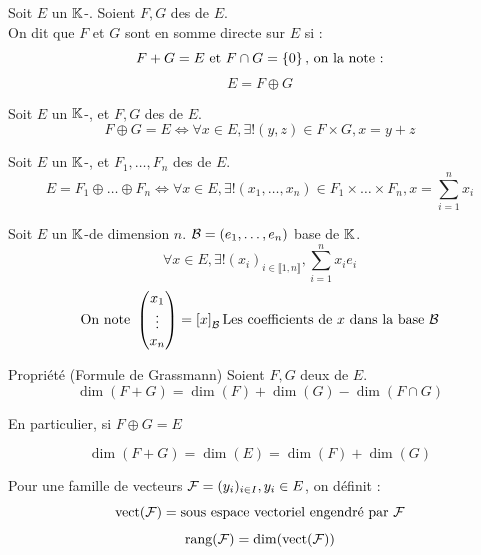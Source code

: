 \documentclass[]{report}
\begin{document}
    \begin{df}{}{}
        Soit $E$ un $\mathbb{K}$-\ev. Soient $F,G$ des \sevs de $E$.\\
        On dit que $F$ et $G$ sont en somme directe sur $E$ si :
        \[F+G=E\text{ et }F\cap G=\left\{ 0 \right\}\text{, on la note :}\]
        \[E=F\oplus G\]
    \end{df}

    \begin{prop}{}{}
        Soit $E$ un $\mathbb{K}$-\ev, et $F,G$ des \sevs de $E$.\\
        \[F\oplus G=E\iff \forall x\in E,\exists! (y,z)\in F\times G,x=y+z\]
    \end{prop}

    \begin{df}{}{}
        Soit $E$ un $\mathbb{K}$-\ev, et $F_1,\ldots,F_n$ des \sevs de $E$.\\
        \[E=F_1\oplus\dots\oplus F_n\iff \forall x\in E, \exists!(x_1,\ldots,x_n)\in F_1\times\ldots\times F_n,x=\sum_{i=1}^n x_i\]
    \end{df}

    \begin{nt}{}{}
        Soit $E$ un $\mathbb{K}$-\ev de dimension $n$. $\mathcal{B}=(e_1,\ldots,e_n)$ base de $\mathbb{K}$.\\
        \[\forall x \in E, \exists!(x_i)_{i\in \llbracket 1,n\rrbracket},\sum_{i=1}^n x_i e_i\]
        \[\text{On note } \begin{pmatrix}
        x_1\\
        \vdots\\
        x_n
        \end{pmatrix}=\left[x\right]_{\mathcal{B}} \text{Les coefficients de $x$ dans la base $\mathcal{B}$}\]
    \end{nt}

    \begin{prop}{Propriété (Formule de Grassmann)}{}
        Soient $F,G$ deux \sevs de $E$.\\
        \[\dim(F+G)=\dim(F)+\dim(G)-\dim(F\cap G)\]
        \begin{center}
            En particulier, si $F\oplus G=E$
        \end{center}
        \[\dim(F+G)=\dim(E)=\dim(F)+\dim(G)\]
    \end{prop}

    \begin{df}{}{}
        Pour une famille de vecteurs $\mathcal{F}=(y_i)_{i\in I}, y_i\in E$, on définit :\\
        \[\text{vect}(\mathcal{F})=\text{\text{sous espace vectoriel} engendré par $\mathcal{F}$}\]
        \[\text{rang}(\mathcal{F})=\dim(\text{vect}(\mathcal{F}))\]
    \end{df}
\end{document}
